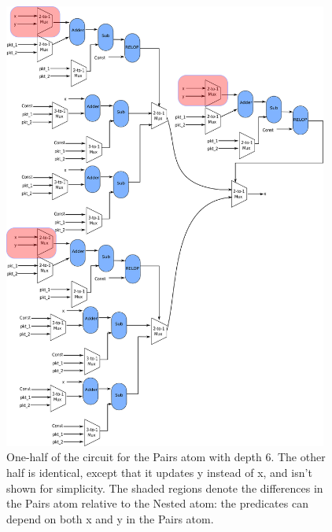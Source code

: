 \newpage
\begin{figure}[!htbp]
  \includegraphics[width=0.95\textwidth]{pairs.pdf}
  \caption{One-half of the circuit for the Pairs atom with depth 6. The other
  half is identical, except that it updates y instead of x, and isn't shown for
simplicity. The shaded regions denote the differences in the Pairs atom
relative to the Nested atom: the predicates can depend on both x and y in the Pairs
atom.}
\label{fig:pairs}
\end{figure}
